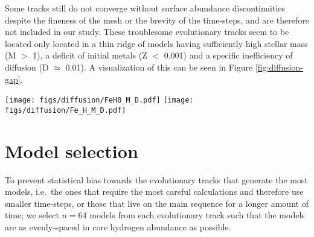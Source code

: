 \documentclass[twocolumn,twocolappendix]{aastex6}
\begin{document}
Some tracks still do not converge without surface abundance discontinuities despite the fineness of the mesh or the brevity of the time-steps, and are therefore not included in our study. These troublesome evolutionary tracks seem to be located only located in a thin ridge of models having sufficiently high stellar mass (M $>$ 1), a deficit of initial metals (Z $<$ 0.001) and a specific inefficiency of diffusion (D $\simeq$ 0.01). A visualization of this can be seen in Figure \ref{fig:diffusion-gap}.

\begin{figure*}
    \centering
    \texttt{[image: figs/diffusion/FeH0\_M\_D.pdf]}\hfill
    \texttt{[image: figs/diffusion/Fe\_H\_M\_D.pdf]}
    \caption{Stellar mass as a function of diffusion factor colored by initial surface metallicity (left) and final surface metallicity (right). A ridge of unconverged evolutionary tracks can be seen around a diffusion factor of 0.01. Beyond this ridge, tracks that were initially metal-poor end their main-sequence lives with all of their metals drained from their surfaces. \label{fig:diffusion-gap} }
\end{figure*}


\section{Model selection}
\label{sec:selection}
To prevent statistical bias towards the evolutionary tracks that generate the most models, i.e.\ the ones that require the most careful calculations and therefore use smaller time-steps, or those that live on the main sequence for a longer amount of time; we select $n=64$ models from each evolutionary track such that the models are as evenly-spaced in core hydrogen abundance as possible. 
\end{document}

